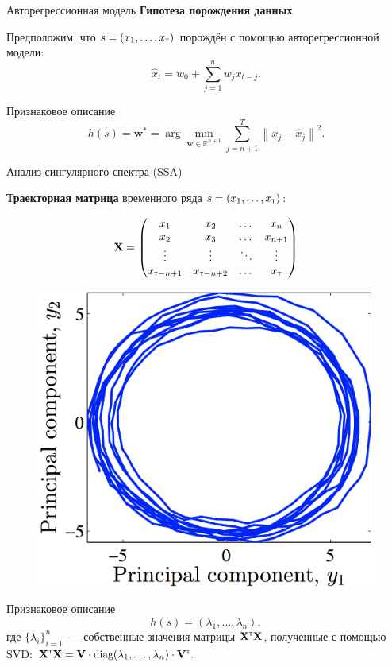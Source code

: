 \documentclass{beamer}
\newcommand{\T}{{\text{\tiny\sffamily\upshape\mdseries T}}}
\begin{document}
\begin{frame}{Авторегрессионная модель}
	\textbf{Гипотеза порождения данных}
	
		Предположим, что $s = (x_1, \dots, x_\T)$ порождён с помощью авторегрессионной модели:
		\[
			\widehat{x}_t = w_0 + \sum_{j=1}^n w_j x_{t-j}.
		\]
	\vfill
	\begin{block}{Признаковое описание}
		\[
			h(s) = \mathbf{w}^* = \arg \min_{\mathbf{w} \in \mathbb{R}^{n+1}} \sum_{j=n+1}^{T} \left\| x_j - \hat{x}_j \right\|^2.
		\]
	\end{block}
\end{frame}
\begin{frame}{Анализ сингулярного спектра (SSA)}
	
	\textbf{Траекторная матрица} временного ряда $s = (x_1, \dots, x_\T)$:
	
	\begin{minipage}[t]{0.56\columnwidth}
	\[
		\mathbf{X} = 
		\begin{pmatrix}
			x_1 & x_2 & \dots & x_n \\
			x_2 & x_3 & \dots & x_{n+1} \\
			\vdots & \vdots & \ddots & \vdots\\
			x_{\T-n+1} & x_{\T-n+2} & \dots & x_{\T}
		\end{pmatrix}
	\]
	\end{minipage}
	\begin{minipage}[t]{0.38\columnwidth}
		\begin{figure}
			\includegraphics[width=.8\linewidth]{ssa}
		\end{figure}
	\end{minipage}
	\vfill
	\begin{block}{Признаковое описание}
		\[
			h(s) = \left(\lambda_1, \dots ,\lambda_n\right),
		\]
		где $\{\lambda_i\}_{i=1}^n$~--- собственные значения матрицы $\mathbf{X}^{\T} \mathbf{X}$, полученные с помощью SVD:
		$
			\mathbf{X}^{\T} \mathbf{X} = \mathbf{V} \cdot \text{diag} (\lambda_1, \dots, \lambda_n) \cdot \mathbf{V}^{\T}.
		$
	\end{block}
\end{frame}
\end{document}
